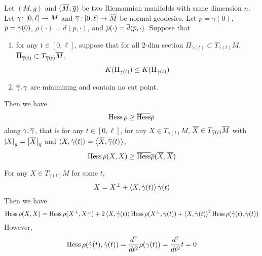 \begin{enumerate}[label=\arabic{*}]
	\begin{thm}\label{thm:hessiancomp}
		Let $(M,g)$ and $(\overline{M},\overline{g})$ be two Riemannian manifolds with same dimension $n$. Let $\gamma \colon [0,\ell] \rightarrow M$ and $\overline{\gamma} \colon [0,\ell] \rightarrow \overline{M}$ be normal geodesics. Let $p = \gamma(0)$, $\overline{p} = \overline{\gamma}(0)$, $\rho(\cdot) = d(p,\cdot)$, and $\overline{\rho}(\cdot)=\overline{d}(\overline{p},\cdot)$. Suppose that
		\begin{enumerate}[label=(\roman*)]
			\item for any $t \in [0,\ell]$, suppose that for all $2$-dim section $\Pi_{\gamma(t)} \subset T_{\gamma(t)}M$, $\overline{\Pi}_{\overline{\gamma}(t)} \subset T_{\overline{\gamma}(t)}\overline{M}$,
			\begin{equation*}
				K(\Pi_{\gamma(t)}) \leq K(\overline{\Pi}_{\overline{\gamma}(t)})
			\end{equation*}
			\item $\overline{\gamma},\gamma$ are minimizing and contain no cut point.
		\end{enumerate}
		Then we have
		\begin{equation*}
			\operatorname{Hess} \rho \geq \overline{\operatorname{Hess}} \overline{\rho}
		\end{equation*}
		along $\gamma,\overline{\gamma}$, that is  for any $t \in [0,\ell]$, for any $X \in T_{\gamma(t)}M$, $\overline{X} \in T_{\overline{\gamma}(t)}\overline{M}$ with $\left\lvert X\right\lvert_g = \left\lvert\overline{X}\right\lvert_{\overline{g}}$ and $\left\langle X,\dot{\gamma}(t) \right\rangle = \left\langle \overline{X},\dot{\overline{\gamma}}(t) \right\rangle$,
		\begin{equation*}
			\operatorname{Hess} \rho(X,X) \geq \overline{\operatorname{Hess}} \overline{\rho}(\overline{X},\overline{X})
		\end{equation*}
	\end{thm}
	\begin{rmk}
		For any $X \in T_{\gamma(t)}M$ for some $t$,
		\begin{equation*}
			X = X^\perp + \left\langle X,\dot{\gamma}(t) \right\rangle\dot{\gamma}(t)
		\end{equation*}
		Then we have
		\begin{equation*}
			\operatorname{Hess} \rho(X,X) = \operatorname{Hess} \rho(X^\perp,X^\perp) + 2\left\langle X,\dot{\gamma}(t) \right\rangle\operatorname{Hess} \rho(X^\perp,\dot{\gamma}(t)) + \left\langle X,\dot{\gamma}(t) \right\rangle^2\operatorname{Hess} \rho(\dot{\gamma}(t),\dot{\gamma}(t))
		\end{equation*}
		However,
		\begin{equation*}
			\operatorname{Hess} \rho(\dot{\gamma}(t),\dot{\gamma}(t)) = \frac{d^2}{dt^2} \rho(\gamma(t)) = \frac{d^2}{dt^2} t = 0
		\end{equation*}

\end{rmk}
\end{enumerate}
